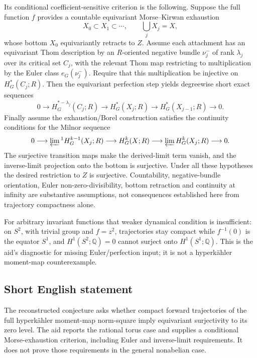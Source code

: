 \documentclass[11pt]{article}
\newcommand{\Q}{\mathbb{Q}}
\begin{document}
Its conditional coefficient-sensitive criterion is the following. Suppose the full function \(f\) provides a countable equivariant Morse--Kirwan exhaustion
\[
 X_0\subset X_1\subset\cdots,\qquad \bigcup_jX_j=X,
\]
whose bottom \(X_0\) equivariantly retracts to \(Z\). Assume each attachment has an equivariant Thom description by an \(R\)-oriented negative bundle \(\nu_j^-\) of rank \(\lambda_j\) over its critical set \(C_j\), with the relevant Thom map restricting to multiplication by the Euler class
\(e_G(\nu_j^-)\). Require that this multiplication be injective on \(H_G^*(C_j;R)\). Then the equivariant perfection step yields degreewise short exact sequences
\[
 0\longrightarrow H_G^{*-\lambda_j}(C_j;R)
 \longrightarrow H_G^*(X_j;R)
 \longrightarrow H_G^*(X_{j-1};R)\longrightarrow0.
\]
Finally assume the exhaustion/Borel construction satisfies the continuity conditions for the Milnor sequence
\[
 0\longrightarrow\varprojlim{}^{1}H_G^{k-1}(X_j;R)
 \longrightarrow H_G^k(X;R)
 \longrightarrow\varprojlim H_G^k(X_j;R)\longrightarrow0.
\]
The surjective transition maps make the derived-limit term vanish, and the inverse-limit projection onto the bottom is surjective. Under all these hypotheses the desired restriction to \(Z\) is surjective. Countability, negative-bundle orientation, Euler non-zero-divisibility, bottom retraction and continuity at infinity are substantive assumptions, not consequences established here from trajectory compactness alone.

For arbitrary invariant functions that weaker dynamical condition is insufficient: on \(S^2\), with trivial group and \(f=z^2\), trajectories stay compact while \(f^{-1}(0)\) is the equator \(S^1\), and \(H^1(S^2;\Q)=0\) cannot surject onto \(H^1(S^1;\Q)\). This is the aid's diagnostic for missing Euler/perfection input; it is not a hyperk\"ahler moment-map counterexample.
\subsection{Short English statement}
The reconstructed conjecture asks whether compact forward trajectories of the full hyperk\"ahler moment-map norm-square imply equivariant surjectivity to its zero level. The aid reports the rational torus case and supplies a conditional Morse-exhaustion criterion, including Euler and inverse-limit requirements. It does not prove those requirements in the general nonabelian case.
\end{document}
